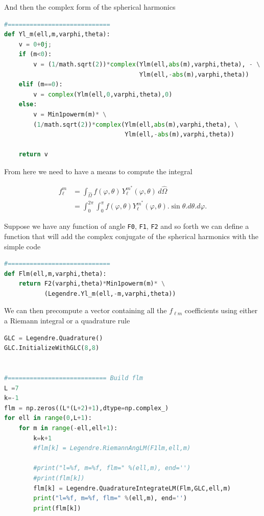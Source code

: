 \documentclass[11pt,letterpaper,titlepage]{article}
\numberwithin{equation}{section}
\begin{document}
\begin{appendices}
And then the complex form of the spherical harmonics
\begin{lstlisting}[language=python]
#============================
def Yl_m(ell,m,varphi,theta):
    v = 0+0j;
    if (m<0):
        v = (1/math.sqrt(2))*complex(Ylm(ell,abs(m),varphi,theta), - \
                                     Ylm(ell,-abs(m),varphi,theta))
    elif (m==0):
        v = complex(Ylm(ell,0,varphi,theta),0)
    else:
        v = Min1powerm(m)* \
        (1/math.sqrt(2))*complex(Ylm(ell,abs(m),varphi,theta), \
                                 Ylm(ell,-abs(m),varphi,theta))
        
    return v
\end{lstlisting}

\newpage
From here we need to have a means to compute the integral

\begin{equation*}
\begin{aligned}
f_{\ell }^m
&=\int _{\hat{\Omega} }f(\varphi,\theta )\,Y_{\ell }^{m^*}(\varphi,\theta)\,d\hat{\Omega} \\
&=\int _{0}^{2\pi }\int _{0}^{\pi } f(\varphi,\theta )Y_{\ell }^{m^*}(\varphi,\theta ) .\sin \theta .d\theta .d\varphi .
\end{aligned}
\end{equation*}

Suppose we have any function of angle \texttt{F0}, \texttt{F1}, \texttt{F2} and so forth we can define a function that will add the complex conjugate of the spherical harmonics with the simple code

\begin{lstlisting}[language=python]
#============================
def Flm(ell,m,varphi,theta):
    return F2(varphi,theta)*Min1powerm(m)* \
           (Legendre.Yl_m(ell,-m,varphi,theta))
\end{lstlisting}

We can then precompute a vector containing all the $f_{\ell m}$ coefficients using either a Riemann integral or a quadrature rule

\begin{lstlisting}[language=python]
GLC = Legendre.Quadrature()
GLC.InitializeWithGLC(8,8)


#=========================== Build flm
L =7
k=-1
flm = np.zeros((L*(L+2)+1),dtype=np.complex_)
for ell in range(0,L+1):
    for m in range(-ell,ell+1):
        k=k+1
        #flm[k] = Legendre.RiemannAngLM(F1lm,ell,m)
        
        #print("l=%f, m=%f, flm=" %(ell,m), end='')
        #print(flm[k])
        flm[k] = Legendre.QuadratureIntegrateLM(Flm,GLC,ell,m)
        print("l=%f, m=%f, flm=" %(ell,m), end='')
        print(flm[k])
\end{lstlisting}


\end{appendices}
\end{document}
